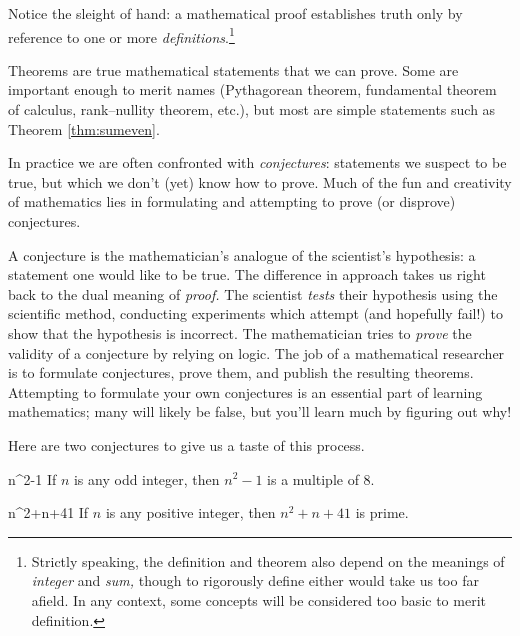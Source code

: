Notice the sleight of hand: a mathematical proof establishes truth only by reference to one or more \emph{definitions}.\footnote{%
	Strictly speaking, the definition and theorem also depend on the meanings of \emph{integer} and \emph{sum,} though to rigorously define either would take us too far afield. In any context, some concepts will be considered too basic to merit definition.%
}


\goodbreak



Theorems are true mathematical statements that we can prove. Some are important enough to merit names (Pythagorean theorem, fundamental theorem of calculus, rank--nullity theorem, etc.), but most are simple statements such as Theorem \ref{thm:sumeven}.\smallbreak

In practice we are often confronted with \emph{conjectures}: statements we suspect to be true, but which we don't (yet) know how to prove. Much of the fun and creativity of mathematics lies in formulating and attempting to prove (or disprove) conjectures.\smallbreak

A conjecture is the mathematician's analogue of the scientist's hypothesis: a statement one would like to be true. The difference in approach takes us right back to the dual meaning of \emph{proof.} The scientist \emph{tests} their hypothesis using the scientific method, conducting experiments which attempt (and hopefully fail!) to show that the hypothesis is incorrect. The mathematician tries to \emph{prove} the validity of a conjecture by relying on logic. The job of a mathematical researcher is to formulate conjectures, prove them, and publish the resulting theorems. Attempting to formulate your own conjectures is an essential part of learning mathematics; many will likely be false, but you'll learn much by figuring out why!\medbreak

Here are two conjectures to give us a taste of this process.

\begin{conj}{}{n^2-1}
	If $n$ is any odd integer, then $n^2-1$ is a multiple of 8.
\end{conj}

\begin{conj}{}{n^2+n+41}
	If $n$ is any positive integer, then $n^2+n+41$ is prime.\footnotemark
\end{conj}


